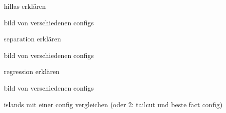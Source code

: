 \begin{frame}{hillas}
    erklären

    bild von verschiedenen configs
\end{frame}

\begin{frame}{separation}
    erklären

    bild von verschiedenen configs
\end{frame}

\begin{frame}{regression}
    erklären

    bild von verschiedenen configs
\end{frame}

\begin{frame}{islands}
    mit einer config vergleichen (oder 2: tailcut und beste fact config)
\end{frame}